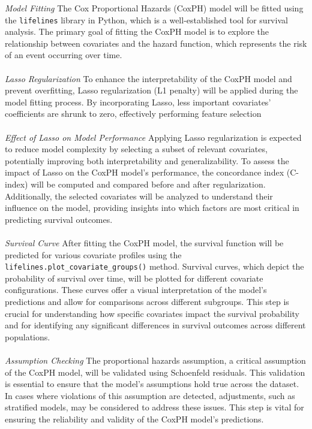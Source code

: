 \textit{Model Fitting} The Cox Proportional Hazards (CoxPH) model will be fitted using the \texttt{lifelines} library in Python, which is a well-established tool for survival analysis. The primary goal of fitting the CoxPH model is to explore the relationship between covariates and the hazard function, which represents the risk of an event occurring over time.
\\\\
\noindent \textit{Lasso Regularization} To enhance the interpretability of the CoxPH model and prevent overfitting, Lasso regularization (L1 penalty) will be applied during the model fitting process. By incorporating Lasso, less important covariates' coefficients are shrunk to zero, effectively performing feature selection \parencite{tibshirani_regression_1996}
\\\\
\noindent \textit{Effect of Lasso on Model Performance} Applying Lasso regularization is expected to reduce model complexity by selecting a subset of relevant covariates, potentially improving both interpretability and generalizability. To assess the impact of Lasso on the CoxPH model's performance, the concordance index (C-index) will be computed and compared before and after regularization. Additionally, the selected covariates will be analyzed to understand their influence on the model, providing insights into which factors are most critical in predicting survival outcomes.
\\\\
\noindent \textit{Survival Curve} After fitting the CoxPH model, the survival function will be predicted for various covariate profiles using the \texttt{lifelines.plot\_covariate\_groups()} method. Survival curves, which depict the probability of survival over time, will be plotted for different covariate configurations. These curves offer a visual interpretation of the model's predictions and allow for comparisons across different subgroups. This step is crucial for understanding how specific covariates impact the survival probability and for identifying any significant differences in survival outcomes across different populations.
\\\\
\noindent \textit{Assumption Checking} The proportional hazards assumption, a critical assumption of the CoxPH model, will be validated using Schoenfeld residuals. This validation is essential to ensure that the model's assumptions hold true across the dataset. In cases where violations of this assumption are detected, adjustments, such as stratified models, may be considered to address these issues. This step is vital for ensuring the reliability and validity of the CoxPH model's predictions.


